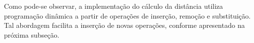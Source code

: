 Como pode-se observar, a implementação do cálculo da distância utiliza programação dinâmica a partir de operações de inserção, remoção e substituição. Tal abordagem facilita a inserção de novas operações, conforme apresentado na próxima subseção.
